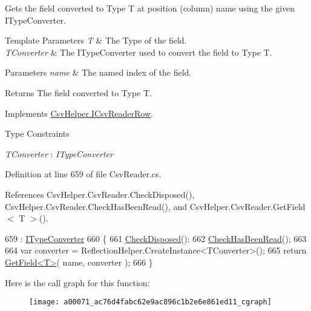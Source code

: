 Gets the field converted to Type T at position (column) name using the given I\-Type\-Converter. 


\begin{DoxyTemplParams}{Template Parameters}
{\em T} & The Type of the field.\\
\hline
{\em T\-Converter} & The I\-Type\-Converter used to convert the field to Type T.\\
\hline
\end{DoxyTemplParams}

\begin{DoxyParams}{Parameters}
{\em name} & The named index of the field.\\
\hline
\end{DoxyParams}
\begin{DoxyReturn}{Returns}
The field converted to Type T.
\end{DoxyReturn}


Implements \hyperlink{a00109_ae7ea281792a1e0e8f64991062a3acffb}{Csv\-Helper.\-I\-Csv\-Reader\-Row}.

\begin{Desc}
\item[Type Constraints]\begin{description}
\item[{\em T\-Converter} : {\em I\-Type\-Converter}]\end{description}
\end{Desc}


Definition at line 659 of file Csv\-Reader.\-cs.



References Csv\-Helper.\-Csv\-Reader.\-Check\-Disposed(), Csv\-Helper.\-Csv\-Reader.\-Check\-Has\-Been\-Read(), and Csv\-Helper.\-Csv\-Reader.\-Get\-Field$<$ T $>$().


\begin{DoxyCode}
659                                                                                  : 
      \hyperlink{a00117}{ITypeConverter}
660         \{
661             \hyperlink{a00071_a6fa45a46ed1322dc1872ca2321b5edbc}{CheckDisposed}();
662             \hyperlink{a00071_a2d9249171ed1568e45d152766d364c31}{CheckHasBeenRead}();
663 
664             var converter = ReflectionHelper.CreateInstance<TConverter>();
665             \textcolor{keywordflow}{return} \hyperlink{a00071_a6a43cfaf39caea93ecd87e506be7b404}{GetField<T>}( name, converter );
666         \}
\end{DoxyCode}


Here is the call graph for this function\-:
\nopagebreak
\begin{figure}[H]
\begin{center}
\leavevmode
\texttt{[image: a00071\_ac76d4fabc62e9ac896c1b2e6e861ed11\_cgraph]}
\end{center}
\end{figure}


